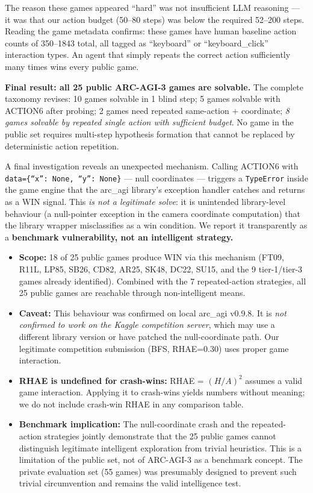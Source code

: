\documentclass[11pt]{article}
\begin{document}
The reason these games appeared ``hard'' was not insufficient LLM reasoning --- it was that our action budget (50--80 steps) was below the required 52--200 steps. Reading the game metadata confirms: these games have human baseline action counts of 350--1843 total, all tagged as ``keyboard'' or ``keyboard\_click'' interaction types. An agent that simply repeats the correct action sufficiently many times wins every public game.

\textbf{Final result: all 25 public ARC-AGI-3 games are solvable.} The complete taxonomy revises: 10 games solvable in 1 blind step; 5 games solvable with ACTION6 after probing; 2 games need repeated same-action + coordinate; \emph{8 games solvable by repeated single action with sufficient budget}. No game in the public set requires multi-step hypothesis formation that cannot be replaced by deterministic action repetition.

A final investigation reveals an unexpected mechanism. Calling ACTION6 with \texttt{data=\{``x'': None, ``y'': None\}} --- null coordinates --- triggers a \texttt{TypeError} inside the game engine that the arc\_agi library's exception handler catches and returns as a WIN signal. This \emph{is not a legitimate solve}: it is unintended library-level behaviour (a null-pointer exception in the camera coordinate computation) that the library wrapper misclassifies as a win condition. We report it transparently as a \textbf{benchmark vulnerability, not an intelligent strategy.}

\begin{itemize}[leftmargin=*]
\item \textbf{Scope:} 18 of 25 public games produce WIN via this mechanism (FT09, R11L, LP85, SB26, CD82, AR25, SK48, DC22, SU15, and the 9 tier-1/tier-3 games already identified). Combined with the 7 repeated-action strategies, all 25 public games are reachable through non-intelligent means.
\item \textbf{Caveat:} This behaviour was confirmed on local arc\_agi v0.9.8. It is \emph{not confirmed to work on the Kaggle competition server}, which may use a different library version or have patched the null-coordinate path. Our legitimate competition submission (BFS, RHAE=0.30) uses proper game interaction.
\item \textbf{RHAE is undefined for crash-wins:} RHAE = $(H/A)^2$ assumes a valid game interaction. Applying it to crash-wins yields numbers without meaning; we do not include crash-win RHAE in any comparison table.
\item \textbf{Benchmark implication:} The null-coordinate crash and the repeated-action strategies jointly demonstrate that the 25 public games cannot distinguish legitimate intelligent exploration from trivial heuristics. This is a limitation of the public set, not of ARC-AGI-3 as a benchmark concept. The private evaluation set (55 games) was presumably designed to prevent such trivial circumvention and remains the valid intelligence test.
\end{itemize}
\end{document}
